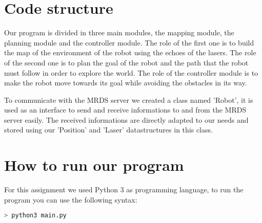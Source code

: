 \section{Code structure}

Our program is divided in three main modules, the mapping module, the planning module and the controller module.
The role of the first one is to build the map of the environment of the robot using the echoes of the lasers.
The role of the second one is to plan the goal of the robot and the path that the robot must follow in order to explore the world.
The role of the controller module is to make the robot move towards its goal while avoiding the obstacles in its way.

To communicate with the MRDS server we created a class named 'Robot', it is used as an interface to send and receive informations to and from the MRDS server easily.
The received informations are directly adapted to our needs and stored using our 'Position' and 'Laser' datastructures in this class.

\section{How to run our program}

For this assignment we used Python 3 as programming language, to run the program you can use the following syntax:

\begin{lstlisting}[language=bash]
> python3 main.py
\end{lstlisting}
